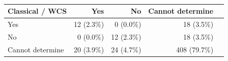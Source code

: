 \begin{table}[H]
\caption{}
\label{}
\begin{tabular}{lrrrr}
\toprule
Classical / WCS & Yes & No & Cannot determine \\ 
\midrule
Yes & \cellcolor{blue!2}12 (2.3\%) & \cellcolor{blue!0}0 (0.0\%) & \cellcolor{blue!4}18 (3.5\%) \\
No & \cellcolor{blue!0}0 (0.0\%) & \cellcolor{blue!2}12 (2.3\%) & \cellcolor{blue!4}18 (3.5\%) \\
Cannot determine & \cellcolor{blue!4}20 (3.9\%) & \cellcolor{blue!5}24 (4.7\%) & \cellcolor{blue!80}408 (79.7\%) \\
\bottomrule
\end{tabular}
\end{table}